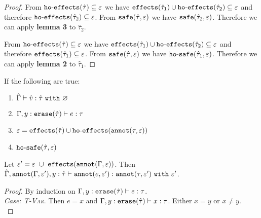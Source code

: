 \begin{appendix}
\begin{proof}
From $\mathtt{ho \hbox{-} effects}(\hat \tau) \subseteq \varepsilon$ we have $\mathtt{effects}(\hat \tau_1) \cup \mathtt{ho \hbox{-} effects}(\hat \tau_2) \subseteq \varepsilon$ and therefore $\mathtt{ho \hbox{-} effects}(\hat \tau_2) \subseteq \varepsilon$. From $\mathtt{safe}(\hat \tau, \varepsilon)$ we have $\mathtt{safe}(\hat \tau_2, \varepsilon)$. Therefore we can apply \textbf{lemma 3} to $\hat \tau_2$.

From $\mathtt{ho \hbox{-} effects}(\hat \tau) \subseteq \varepsilon$ we have $\mathtt{effects}(\hat \tau_1) \cup \mathtt{ho \hbox{-} effects}(\hat \tau_2) \subseteq \varepsilon$ and therefore $\mathtt{effects}(\hat \tau_1) \subseteq \varepsilon$. From $\mathtt{safe}(\hat \tau, \varepsilon)$ we have $\mathtt{ho \hbox{-} safe}(\hat \tau_1, \varepsilon)$. Therefore we can apply \textbf{lemma 2} to $\hat \tau_1$.

\end{proof}


\hrulefill

\begin{lemma}[Annotation]
If the following are true:

\begin{enumerate}
	\setlength\itemsep{-0.7em}
	\item $\hat \Gamma \vdash \hat v : \hat \tau~\mathtt{with}~ \varnothing$
	\item $\Gamma, y: \mathtt{erase}(\hat \tau) \vdash e: \tau$
	\item $\varepsilon = \mathtt{effects}(\hat \tau) \cup \mathtt{ho \hbox{-} effects}(\mathtt{annot}(\tau, \varepsilon))$
	\item $\mathtt{ho \hbox{-} safe}(\hat \tau, \varepsilon)$
\end{enumerate}

\noindent
Let $\varepsilon' = \varepsilon~\cup~ \mathtt{effects}(\mathtt{annot}(\Gamma, \varepsilon))$. Then $\hat \Gamma, \mathtt{annot}(\Gamma, \varepsilon'), y: \hat \tau \vdash \mathtt{annot}(e, \varepsilon') : \mathtt{annot}(\tau, \varepsilon')~\mathtt{with}~ \varepsilon'$.
\end{lemma}

\begin{proof}
By induction on $\Gamma, y: \mathtt{erase}(\hat \tau) \vdash e: \tau$.\\

\textit{Case: \textsc{T-Var}}. Then $e=x$ and $\Gamma, y: \mathtt{erase}(\hat \tau) \vdash x: \tau$. Either $x=y$ or $x \neq y$. \\


\end{proof}
\end{appendix}
